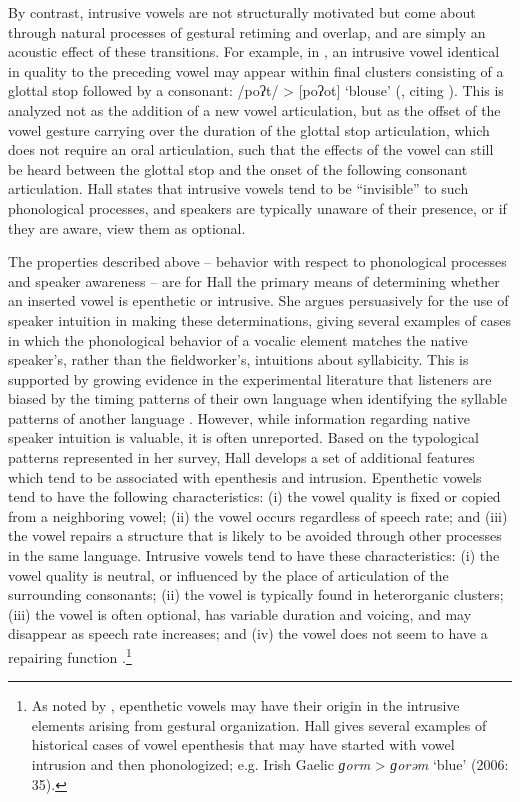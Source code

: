   By contrast, intrusive vowels are not structurally motivated but come about through natural processes of gestural retiming and overlap, and are simply an acoustic effect of these transitions. For example, in , an intrusive vowel identical in quality to the preceding vowel may appear within final clusters consisting of a glottal stop followed by a consonant: /poʔt/ > [poʔot] ‘blouse’ (\citealt[7]{Hall2006}, citing \citealt{Campbell1974}). This is analyzed not as the addition of a new vowel articulation, but as the offset of the vowel gesture carrying over the duration of the glottal stop articulation, which does not require an oral articulation, such that the effects of the vowel can still be heard between the glottal stop and the onset of the following consonant articulation. Hall states that intrusive vowels tend to be ``invisible'' to such phonological processes, and speakers are typically unaware of their presence, or if they are aware, view them as optional.

  The properties described above -- behavior with respect to phonological processes and speaker awareness -- are for Hall the primary means of determining whether an inserted vowel is epenthetic or intrusive. She argues persuasively for the use of speaker intuition in making these determinations, giving several examples of cases in which the phonological behavior of a vocalic element matches the native speaker’s, rather than the fieldworker’s, intuitions about syllabicity. This is supported by growing evidence in the experimental literature that listeners are biased by the timing patterns of their own language when identifying the syllable patterns of another language \citep{KwonEtAl2017}. However, while information regarding native speaker intuition is valuable, it is often unreported. Based on the typological patterns represented in her survey, Hall develops a set of additional features which tend to be associated with epenthesis and intrusion. Epenthetic vowels tend to have the following characteristics: (i) the vowel quality is fixed or copied from a neighboring vowel; (ii) the vowel occurs regardless of speech rate; and (iii) the vowel repairs a structure that is likely to be avoided through other processes in the same language. Intrusive vowels tend to have these characteristics: (i) the vowel quality is neutral, or influenced by the place of articulation of the surrounding consonants; (ii) the vowel is typically found in heterorganic clusters; (iii) the vowel is often optional, has variable duration and voicing, and may disappear as speech rate increases; and (iv) the vowel does not seem to have a repairing function \citep[391]{Hall2006}.\footnote{As noted by \citet[53]{BrowmanGoldstein1992a}, epenthetic vowels may have their origin in the intrusive elements arising from gestural organization. Hall gives several examples of historical cases of vowel epenthesis that may have started with vowel intrusion and then phonologized; e.g. Irish Gaelic \textit{ɡorm} > \textit{ɡorəm} ‘blue’ (2006: 35).}

